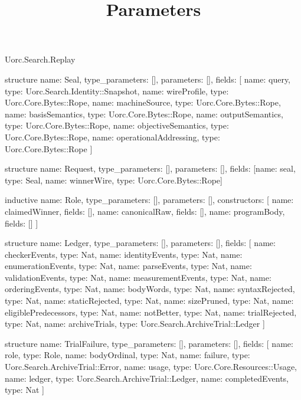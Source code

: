 \begin{lexlean}{Uorc.Search.Replay}
\title{Parameters}
\begin{semanticmodule}
structure{
  name: Seal,
  type_parameters: [],
  parameters: [],
  fields: [
    {name: query, type: Uorc.Search.Identity::Snapshot},
    {name: wireProfile, type: Uorc.Core.Bytes::Rope},
    {name: machineSource, type: Uorc.Core.Bytes::Rope},
    {name: basisSemantics, type: Uorc.Core.Bytes::Rope},
    {name: outputSemantics, type: Uorc.Core.Bytes::Rope},
    {name: objectiveSemantics, type: Uorc.Core.Bytes::Rope},
    {name: operationalAddressing, type: Uorc.Core.Bytes::Rope}
  ]
}

structure{
  name: Request,
  type_parameters: [],
  parameters: [],
  fields: [{name: seal, type: Seal}, {name: winnerWire, type: Uorc.Core.Bytes::Rope}]
}

inductive{
  name: Role,
  type_parameters: [],
  parameters: [],
  constructors: [
    {name: claimedWinner, fields: []},
    {name: canonicalRaw, fields: []},
    {name: programBody, fields: []}
  ]
}

structure{
  name: Ledger,
  type_parameters: [],
  parameters: [],
  fields: [
    {name: checkerEvents, type: Nat},
    {name: identityEvents, type: Nat},
    {name: enumerationEvents, type: Nat},
    {name: parseEvents, type: Nat},
    {name: validationEvents, type: Nat},
    {name: measurementEvents, type: Nat},
    {name: orderingEvents, type: Nat},
    {name: bodyWords, type: Nat},
    {name: syntaxRejected, type: Nat},
    {name: staticRejected, type: Nat},
    {name: sizePruned, type: Nat},
    {name: eligiblePredecessors, type: Nat},
    {name: notBetter, type: Nat},
    {name: trialRejected, type: Nat},
    {name: archiveTrials, type: Uorc.Search.ArchiveTrial::Ledger}
  ]
}

structure{
  name: TrialFailure,
  type_parameters: [],
  parameters: [],
  fields: [
    {name: role, type: Role},
    {name: bodyOrdinal, type: Nat},
    {name: failure, type: Uorc.Search.ArchiveTrial::Error},
    {name: usage, type: Uorc.Core.Resources::Usage},
    {name: ledger, type: Uorc.Search.ArchiveTrial::Ledger},
    {name: completedEvents, type: Nat}
  ]
}


\end{semanticmodule}
\end{lexlean}
